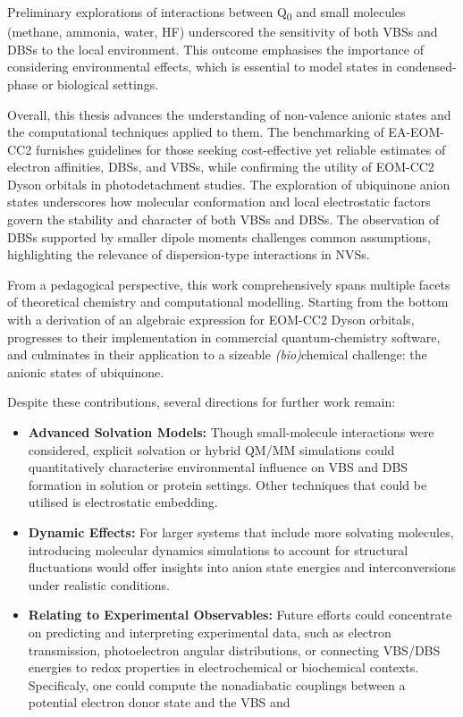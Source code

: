 Preliminary explorations of interactions between Q\textsubscript{0} and small molecules (methane, ammonia, water, HF) underscored the sensitivity of both VBSs and DBSs to the local environment. This outcome emphasises the importance of considering environmental effects, which is essential to model states in condensed-phase or biological settings.

Overall, this thesis advances the understanding of non-valence anionic states and the computational techniques applied to them. The benchmarking of EA-EOM-CC2 furnishes guidelines for those seeking cost-effective yet reliable estimates of electron affinities, DBSs, and VBSs, while confirming the utility of EOM-CC2 Dyson orbitals in photodetachment studies. The exploration of ubiquinone anion states underscores how molecular conformation and local electrostatic factors govern the stability and character of both VBSs and DBSs. The observation of DBSs supported by smaller dipole moments challenges common assumptions, highlighting the relevance of dispersion-type interactions in NVSs.

From a pedagogical perspective, this work comprehensively spans multiple facets of theoretical chemistry and computational modelling. Starting from the bottom with a derivation of an algebraic expression for EOM-CC2 Dyson orbitals, progresses to their implementation in commercial quantum-chemistry software, and culminates in their application to a sizeable \textit{(bio)}chemical challenge: the anionic states of ubiquinone.

Despite these contributions, several directions for further work remain:
\begin{itemize}
    \item \textbf{Advanced Solvation Models:} Though small-molecule interactions were considered, explicit solvation or hybrid QM/MM simulations could quantitatively characterise environmental influence on VBS and DBS formation in solution or protein settings. Other techniques that could be utilised is electrostatic embedding.
    \item \textbf{Dynamic Effects:} For larger systems that include more solvating molecules, introducing molecular dynamics simulations to account for structural fluctuations would offer insights into anion state energies and interconversions under realistic conditions.
    \item \textbf{Relating to Experimental Observables:} Future efforts could concentrate on predicting and interpreting experimental data, such as electron transmission, photoelectron angular distributions, or connecting VBS/DBS energies to redox properties in electrochemical or biochemical contexts. Specificaly, one could compute the nonadiabatic couplings between a potential electron donor state and the VBS and
\end{itemize}
    

